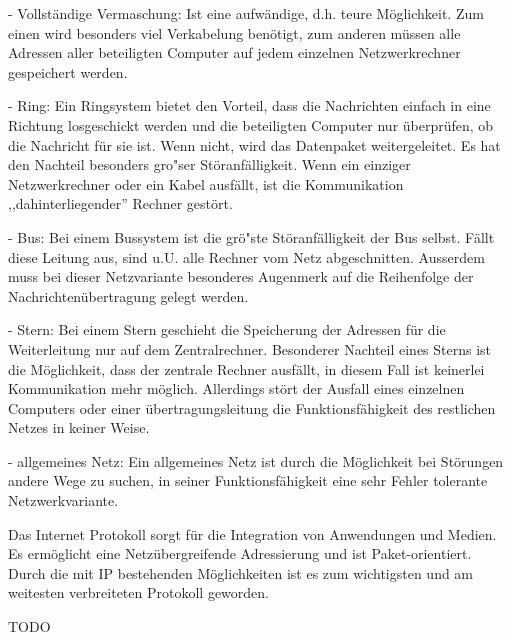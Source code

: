 \begin{answer}
- Vollständige Vermaschung:
Ist eine aufwändige, d.h. teure Möglichkeit. Zum einen wird besonders viel Verkabelung
benötigt, zum anderen müssen alle Adressen aller beteiligten Computer auf jedem einzelnen Netzwerkrechner
gespeichert werden.

- Ring:
Ein Ringsystem bietet den Vorteil, dass die Nachrichten einfach in eine Richtung losgeschickt
werden und die beteiligten Computer nur überprüfen, ob die Nachricht für sie ist. Wenn nicht,
wird das Datenpaket weitergeleitet.
Es hat den Nachteil besonders gro"ser Störanfälligkeit. Wenn ein einziger Netzwerkrechner oder
ein Kabel ausfällt, ist die Kommunikation ,,dahinterliegender'' Rechner gestört.

- Bus:
Bei einem Bussystem ist die grö"ste Störanfälligkeit der Bus selbst. Fällt diese Leitung aus, sind
u.U. alle Rechner vom Netz abgeschnitten. Ausserdem muss bei dieser Netzvariante besonderes
Augenmerk auf die Reihenfolge der Nachrichtenübertragung gelegt werden.

- Stern:
Bei einem Stern geschieht die Speicherung der Adressen für die Weiterleitung nur auf dem Zentralrechner.
Besonderer Nachteil eines Sterns ist die Möglichkeit, dass der zentrale Rechner ausfällt, in
diesem Fall ist keinerlei Kommunikation mehr möglich. Allerdings stört der Ausfall eines einzelnen
Computers oder einer übertragungsleitung die Funktionsfähigkeit des restlichen Netzes in keiner
Weise.

- allgemeines Netz:
Ein allgemeines Netz ist durch die Möglichkeit bei Störungen andere Wege zu suchen, in seiner
Funktionsfähigkeit eine sehr Fehler tolerante Netzwerkvariante.
\end{answer}

\begin{answer}
Das Internet Protokoll sorgt für die Integration von Anwendungen und Medien. Es ermöglicht
eine Netzübergreifende Adressierung und ist Paket-orientiert.
Durch die mit IP bestehenden Möglichkeiten ist es zum wichtigsten und am weitesten verbreiteten Protokoll geworden.
\end{answer}

\begin{answer}
TODO
\end{answer}
